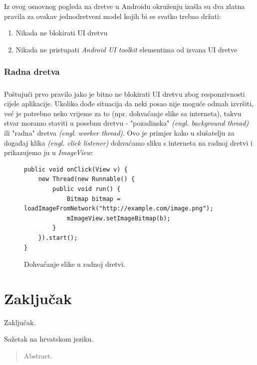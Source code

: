 \documentclass[times, utf8, zavrsni]{fer}
\begin{document}
Iz ovog osnovnog pogleda na dretve u Androidu okruženju izašla su dva zlatna pravila za ovakav jednodretveni model kojih bi se svatko trebao držati:

\begin{enumerate}
\item Nikada ne blokirati UI dretvu
\item Nikada ne pristupati \textit{Android UI toolkit} elementima od izvana UI dretve
\end{enumerate}

\subsection{Radna dretva}
\paragraph{}
Poštujući prvo pravilo jako je bitno ne blokirati UI dretvu zbog responzivnosti cijele aplikacije. Ukoliko dođe situacija da neki posao nije moguće odmah izvršiti, već je potrebno neko vrijeme za to (npr. dohvaćanje slike sa interneta), takvu stvar moramo staviti u posebnu dretvu - "pozadinska" \textit{(engl. background thread)}  ili "radna" dretva \textit{(engl. worker thread)}.\newpage
Ovo je primjer kako u slušatelju za događaj klika \textit{(engl. click listener)} dohvaćamo sliku s interneta na radnoj dretvi i prikazujemo ju u \textit{ImageView}:

\begin{figure}[ht!]
\begin{lstlisting}
public void onClick(View v) {
    new Thread(new Runnable() {
        public void run() {
            Bitmap bitmap = loadImageFromNetwork("http://example.com/image.png");
            mImageView.setImageBitmap(b);
        }
    }).start();
}
\end{lstlisting}
\caption{Dohvaćanje slike u radnoj dretvi.}
\label{overflow}
\end{figure}


\chapter{Zaključak}
Zaključak.




\begin{sazetak}
Sažetak na hrvatskom jeziku.

\end{sazetak}

\begin{abstract}
Abstract.

\end{abstract}
\end{document}
